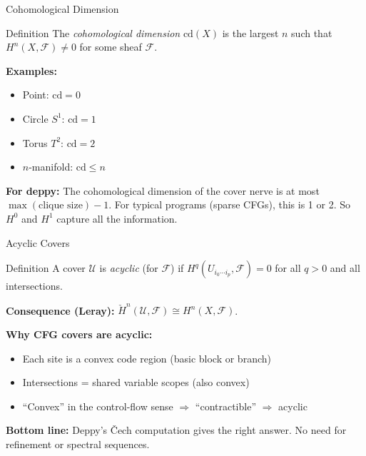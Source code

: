 \documentclass[aspectratio=169,10pt]{beamer}
\newcommand{\Fscr}{\mathcal{F}}
\newcommand{\Uscr}{\mathcal{U}}
\begin{document}
\begin{frame}{Cohomological Dimension}
\begin{block}{Definition}
The \emph{cohomological dimension} $\text{cd}(X)$ is the largest $n$ such that $H^n(X, \Fscr) \neq 0$ for some sheaf $\Fscr$.
\end{block}

\textbf{Examples:}
\begin{itemize}
  \item Point: $\text{cd} = 0$
  \item Circle $S^1$: $\text{cd} = 1$
  \item Torus $T^2$: $\text{cd} = 2$
  \item $n$-manifold: $\text{cd} \leq n$
\end{itemize}

\textbf{For deppy:} The cohomological dimension of the cover nerve is at most $\max(\text{clique size}) - 1$. For typical programs (sparse CFGs), this is 1 or 2. So $H^0$ and $H^1$ capture all the information.
\end{frame}

\begin{frame}{Acyclic Covers}
\begin{block}{Definition}
A cover $\Uscr$ is \emph{acyclic} (for $\Fscr$) if $H^q(U_{i_0 \cdots i_p}, \Fscr) = 0$ for all $q > 0$ and all intersections.
\end{block}

\textbf{Consequence (Leray):} $\check{H}^n(\Uscr, \Fscr) \cong H^n(X, \Fscr)$.

\textbf{Why CFG covers are acyclic:}
\begin{itemize}
  \item Each site is a convex code region (basic block or branch)
  \item Intersections = shared variable scopes (also convex)
  \item ``Convex'' in the control-flow sense $\Rightarrow$ ``contractible'' $\Rightarrow$ acyclic
\end{itemize}

\textbf{Bottom line:} Deppy's \v{C}ech computation gives the right answer. No need for refinement or spectral sequences.
\end{frame}
\end{document}
